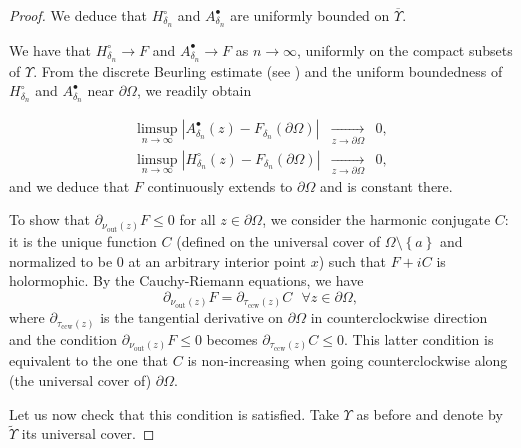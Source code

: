 \documentclass[oneside,english]{amsart}
\numberwithin{equation}{section}
\numberwithin{figure}{section}
\theoremstyle{plain}
\theoremstyle{plain}
\theoremstyle{plain}
\theoremstyle{plain}
\theoremstyle{plain}
\theoremstyle{definition}
\theoremstyle{remark}
\begin{document}
\begin{proof}
We deduce that $H_{\delta_{n}}^{\circ}$ and $A_{\delta_{n}}^{\bullet}$
are uniformly bounded on $\overline{\Upsilon}$.

We have that $H_{\delta_{n}}^{\circ}\to F$ and $A_{\delta_{n}}^{\bullet}\to F$
as $n\to\infty$, uniformly on the compact subsets of $\Upsilon$.
From the discrete Beurling estimate (see \cite{kesten}) and the uniform
boundedness of $H_{\delta_{n}}^{\circ}$ and $A_{\delta_{n}}^{\bullet}$
near $\partial\Omega$, we readily obtain

\begin{eqnarray*}
\limsup_{n\to\infty}\left|A_{\delta_{n}}^{\bullet}\left(z\right)-F_{\delta_{n}}\left(\partial\Omega\right)\right| & \underset{z\to\partial\Omega}{\longrightarrow} & 0,\\
\limsup_{n\to\infty}\left|H_{\delta_{n}}^{\circ}\left(z\right)-F_{\delta_{n}}\left(\partial\Omega\right)\right| & \underset{z\to\partial\Omega}{\longrightarrow} & 0,
\end{eqnarray*}
and we deduce that $F$ continuously extends to $\partial\Omega$
and is constant there. 

To show that $\partial_{\nu_{\mathrm{out}}\left(z\right)}F\leq0$
for all $z\in\partial\Omega$, we consider the harmonic conjugate
$C$: it is the unique function $C$ (defined on the universal cover
of $\Omega\setminus\left\{ a\right\} $ and normalized to be $0$
at an arbitrary interior point $x$) such that $F+iC$ is holormophic.
By the Cauchy-Riemann equations, we have 
\[
\partial_{\nu_{\mathrm{out}}\left(z\right)}F=\partial_{\tau_{\mathrm{ccw}}\left(z\right)}C\,\,\,\,\forall z\in\partial\Omega,
\]
where $\partial_{\tau_{\mathrm{ccw}}\left(z\right)}$ is the tangential
derivative on $\partial\Omega$ in counterclockwise direction and
the condition $\partial_{\nu_{\mathrm{out}}\left(z\right)}F\leq0$
becomes $\partial_{\tau_{\mathrm{ccw}}\left(z\right)}C\leq0$. This
latter condition is equivalent to the one that $C$ is non-increasing
when going counterclockwise along (the universal cover of) $\partial\Omega$. 

Let us now check that this condition is satisfied. Take $\Upsilon$
as before and denote by $\tilde{\Upsilon}$ its universal cover.


\end{proof}
\end{document}
